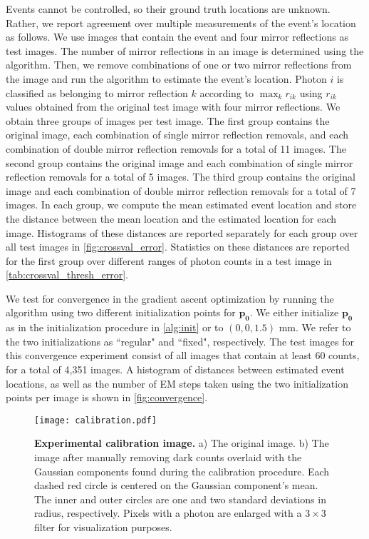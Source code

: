Events cannot be controlled, so their ground truth locations are unknown.
Rather, we report agreement over multiple measurements of the event's location as follows.
We use images that contain the event and four mirror reflections as test images.
The number of mirror reflections in an image is determined using the algorithm.
Then, we remove combinations of one or two mirror reflections from the image and 
run the algorithm to estimate the event's location.
Photon $i$ is classified as belonging to mirror reflection $k$ according to 
$\max_k r_{ik}$ using $r_{ik}$ values obtained from the original test image with 
four mirror reflections.
We obtain three groups of images per test image.
The first group contains the original image, each combination of single mirror 
reflection removals, and each combination of double mirror reflection removals for 
a total of 11 images.
The second group contains the original image and each combination of single mirror 
reflection removals for a total of 5 images.
The third group contains the original image and each combination of double mirror 
reflection removals for a total of 7 images.
In each group, we compute the mean estimated event location and store the distance 
between the mean location and the estimated location for each image.
Histograms of these distances are reported separately for each group over all test 
images in \cref{fig:crossval_error}.
Statistics on these distances are reported for the first group over different 
ranges of photon counts in a test image in \cref{tab:crossval_thresh_error}.

We test for convergence in the gradient ascent optimization by running the 
algorithm using two different initialization points for $\bm{p_0}$. 
We either initialize $\bm{p_0}$ as in the initialization procedure in 
\cref{alg:init} or to $(0,0,1.5)$ mm.
We refer to the two initializations as ``regular" and ``fixed", respectively.
The test images for this convergence experiment consist of all images that contain 
at least 60 counts, for a total of 4,351 images.
A histogram of distances between estimated event locations, as well as the number 
of EM steps taken using the two initialization points per image is shown in \cref{fig:convergence}.


\begin{figure*}
\centering
\texttt{[image: calibration.pdf]}
\caption{\textbf{Experimental calibration image.} a) The original image. b) The image after manually 
removing dark counts overlaid with the Gaussian components found during the 
calibration procedure.
Each dashed red circle is centered on the Gaussian component's mean. 
The inner and outer circles are one and two standard deviations in radius, respectively.
Pixels with a photon are enlarged with a $3 \times 3$ filter for visualization purposes.
} 
\label{fig:calibration}
\end{figure*}


